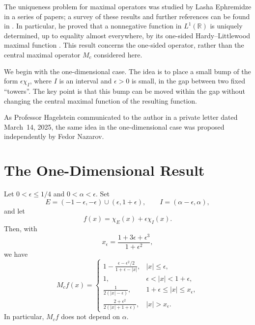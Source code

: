 \documentclass[12pt]{amsart}
\numberwithin{equation}{section}
\begin{document}
The uniqueness problem for maximal operators was studied by Lasha Ephremidze
in a series of papers; a survey of these results and further references can be
found in \cite{ephremidze2010}. In particular, he proved that a nonnegative
function in $L^1(\mathbb{R})$ is uniquely determined, up to equality almost
everywhere, by its one-sided Hardy--Littlewood maximal function
\cite[Theorem~3]{ephremidze2010}. This result concerns the one-sided operator,
rather than the central maximal operator $M_c$ considered here.

We begin with the one-dimensional case. The idea is to place a small bump
of the form $\epsilon\chi_I$, where $I$ is an interval and $\epsilon>0$ is
small, in the gap between two fixed ``towers''. The key point is that this
bump can be moved within the gap without changing the central maximal
function of the resulting function.

As Professor Hagelstein communicated to the author in a private letter
dated March~14, 2025, the same idea in the one-dimensional case was proposed
independently by Fedor Nazarov.

\section{The One-Dimensional Result}
\label{one_dimensional_result}

\begin{theorem}
\label{one_dimensional_theorem}
Let $0<\epsilon\leq1/4$ and $0<\alpha<\epsilon$. Set
\[
E=(-1-\epsilon,-\epsilon)\cup(\epsilon,1+\epsilon),
\qquad I=(\alpha-\epsilon,\alpha),
\]
and let
\[
f(x)=\chi_E(x)+\epsilon\chi_I(x).
\]
Then, with
\[
x_\epsilon=\frac{1+3\epsilon+\epsilon^3}{1+\epsilon^2},
\]
we have
\begin{equation}
\label{one_dimensional_maximal}
M_cf(x)=
\begin{cases}
\displaystyle 1-\frac{\epsilon-\epsilon^2/2}{1+\epsilon-|x|},
    & |x|\leq\epsilon,\\[8pt]
1,  & \epsilon<|x|<1+\epsilon,\\[4pt]
\displaystyle \frac{1}{2(|x|-\epsilon)},
    & 1+\epsilon\leq|x|\leq x_\epsilon,\\[8pt]
\displaystyle \frac{2+\epsilon^2}{2(|x|+1+\epsilon)},
    & |x|>x_\epsilon.
\end{cases}
\end{equation}
In particular, $M_cf$ does not depend on $\alpha$.
\end{theorem}
\end{document}

